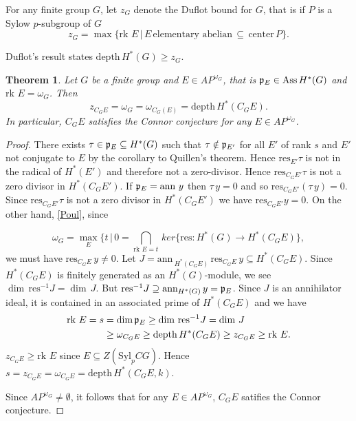 \documentclass[reqno]{amsart}
\theoremstyle{plain}%
\newtheorem{thm}{Theorem}[section]
\theoremstyle{definition}
\theoremstyle{remark}
\newcommand\vv{\,\vert\,}
\newcommand\sub{\subseteq}
\newcommand\dph{\text{depth}\,}
\newcommand\as{\text{Ass}\,}
\newcommand\rk{\text{rk }}
\newcommand\an{\text{ann}\,}
\newcommand\p[1]{\frak p_{#1}}
\newcommand\fg{finitely generated }
\newcommand\res{\text{res}}
\begin{document}
For any finite group $G$, let $z_G$ denote the Duflot bound for $G$, that is if $P$ is a Sylow $p$-subgroup of $G$
$$ z_G=\max\{\rk E\vv E\,\text{elementary abelian}\,\sub\,\text{center}\,P\}.$$

\noindent Duflot's result states $\dph H^*(G)\geq z_G$.

\begin{thm}\label{Sch} Let $G$ be a finite group and $E\in AP^{\omega_G}$, that is $\p E\in\as H^*(G)$ and $\rk E=\omega_G$. Then
$$z_{C_GE}=\omega_G=\omega_{C_G(E)}=\dph H^*(C_GE).$$ In particular, $C_GE$ satisfies the Connor conjecture for any $E\in AP^{\omega_G}$.\end{thm}
\begin{proof} There exists $\tau\in\p E\sub H^*(G)$ such that $\tau\notin \p{E'}$ for all $E'$ of rank $s$ and $E'$ not conjugate to $E$ by the corollary to Quillen's theorem.  Hence $\res_{E'}\tau$ is not in the radical of $H^*(E')$ and therefore not a zero-divisor.  Hence $\res_{C_GE'}\tau$ is not a zero divisor in $H^*(C_GE')$.  If $\p E=\an\,y$ then $\tau\,y=0$ and so $\text{res}_{C_GE'}(\tau\,y)=0$.  Since 
$\text{res}_{C_GE'}\tau$ is not a zero divisor in $H^*(C_GE')$ we have $\res_{C_GE'}y=0$.
On the other hand, \ref{Poul}, since
 
$$\omega_G=\max_E\{t\vv 0=\bigcap_{\rk E=t}\,ker\{\text{res}:H^*(G)\to H^*(C_GE)\},$$
we must have $\text{res}_{C_GE}\,y\neq 0$.  Let $J=\an_{H^*(C_GE)}\, \res_{C_GE}\,y\sub H^*(C_GE)$.  Since $H^*(C_GE)$ is \fg as an $H^*(G)$-module, we see 
$\dim\,\text{res}^{-1}J= \dim\,J$.  
But $\text{res}^{-1}J\supseteq\text{ann}_{H^*(G)}\,y=\p E$.  Since $J$ is an annihilator ideal, it is contained in an associated prime of $H^*(C_GE)$ and we have
$$\begin{aligned} \rk E=s&=\dim \p E\geq \dim\,\text{res}^{-1}J= \dim\,J\\&\geq\omega_{C_GE}\geq\dph H^*(C_GE)\geq z_{C_GE}\geq \rk E.\end{aligned}$$
$z_{C_GE}\geq \rk E$ since $E\sub Z(\text{Syl}_pCG)$.  Hence $s=z_{C_GE}=\omega_{C_GE}=\dph H^*(C_GE,k)$.

Since $AP^{\omega_G}\neq\emptyset$, it follows that for any $E\in AP^{\omega_G}$, $C_GE$ satifies the Connor conjecture.
\end{proof}
\end{document}
